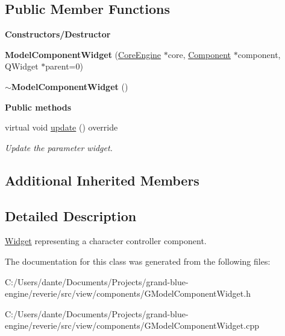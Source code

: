 \subsection*{Public Member Functions}
\begin{Indent}\textbf{ Constructors/\+Destructor}\par
\begin{DoxyCompactItemize}
\item 
\mbox{\label{classrev_1_1_view_1_1_model_component_widget_a03d4bbbcced3b4fa8c0ebb3d01d49561}} 
{\bfseries Model\+Component\+Widget} (\mbox{\hyperlink{classrev_1_1_core_engine}{Core\+Engine}} $\ast$core, \mbox{\hyperlink{classrev_1_1_component}{Component}} $\ast$component, Q\+Widget $\ast$parent=0)
\item 
\mbox{\label{classrev_1_1_view_1_1_model_component_widget_a699b47113c9e7d2f5264ed270c99cb7a}} 
{\bfseries $\sim$\+Model\+Component\+Widget} ()
\end{DoxyCompactItemize}
\end{Indent}
\begin{Indent}\textbf{ Public methods}\par
\begin{DoxyCompactItemize}
\item 
\mbox{\label{classrev_1_1_view_1_1_model_component_widget_aa37c9152b9d0046b0491b628b012ffbc}} 
virtual void \mbox{\hyperlink{classrev_1_1_view_1_1_model_component_widget_aa37c9152b9d0046b0491b628b012ffbc}{update}} () override
\begin{DoxyCompactList}\small\item\em Update the parameter widget. \end{DoxyCompactList}\end{DoxyCompactItemize}
\end{Indent}
\subsection*{Additional Inherited Members}


\subsection{Detailed Description}
\mbox{\hyperlink{class_widget}{Widget}} representing a character controller component. 

The documentation for this class was generated from the following files\+:\begin{DoxyCompactItemize}
\item 
C\+:/\+Users/dante/\+Documents/\+Projects/grand-\/blue-\/engine/reverie/src/view/components/G\+Model\+Component\+Widget.\+h\item 
C\+:/\+Users/dante/\+Documents/\+Projects/grand-\/blue-\/engine/reverie/src/view/components/G\+Model\+Component\+Widget.\+cpp\end{DoxyCompactItemize}
